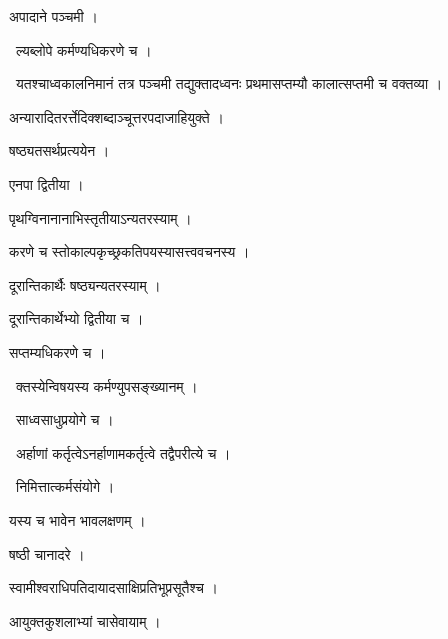 \documentclass[10pt, openany, oneside]{book}
\begin{document}
\noindent अपादाने पञ्चमी ।

\par\noindent\hspace{1.5em}{\vps वा॰}~{\qt ल्यब्लोपे कर्मण्यधिकरणे च ।}

\par\noindent\hspace{1.5em}{\vps वा॰}~{\qt यतश्चाध्वकालनिमानं तत्र पञ्चमी तद्युक्तादध्वनः प्रथमासप्तम्यौ कालात्सप्तमी च वक्तव्या ।}

\noindent अन्यारादितरर्त्तेदिक्शब्दाञ्चूत्तरपदाजाहियुक्ते ।

\noindent षष्ठ्यतसर्थप्रत्ययेन ।

\noindent एनपा द्वितीया ।

\noindent पृथग्विनानानाभिस्तृतीयाऽन्यतरस्याम् ।

\noindent करणे च स्तोकाल्पकृच्छ्रकतिपयस्यासत्त्ववचनस्य ।

\noindent दूरान्तिकार्थैः षष्ठ्यन्यतरस्याम् ।

\noindent दूरान्तिकार्थेभ्यो द्वितीया च ।

\noindent सप्तम्यधिकरणे च ।

\par\noindent\hspace{1.5em}{\vps वा॰}~{\qt क्तस्येन्विषयस्य कर्मण्युपसङ्ख्यानम् ।}

\par\noindent\hspace{1.5em}{\vps वा॰}~{\qt साध्वसाधुप्रयोगे च ।}

\par\noindent\hspace{1.5em}{\vps वा॰}~{\qt अर्हाणां कर्तृत्वेऽनर्हाणामकर्तृत्वे तद्वैपरीत्ये च ।}

\par\noindent\hspace{1.5em}{\vps वा॰}~{\qt निमित्तात्कर्मसंयोगे ।}

\noindent यस्य च भावेन भावलक्षणम् ।

\noindent षष्ठी चानादरे ।

\noindent स्वामीश्वराधिपतिदायादसाक्षिप्रतिभूप्रसूतैश्च ।

\noindent आयुक्तकुशलाभ्यां चासेवायाम् ।
\end{document}
